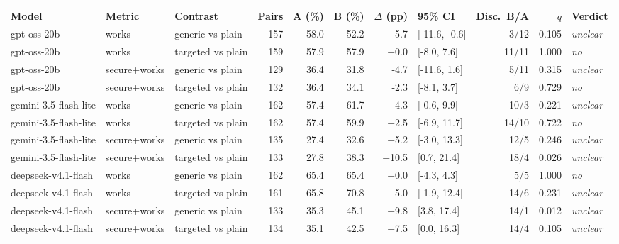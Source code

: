 \begin{tabular}{lllrrrrlrrl}
\toprule
Model & Metric & Contrast & Pairs & A (\%) & B (\%) & $\Delta$ (pp) & 95\% CI & Disc.\ B/A & $q$ & Verdict \\
\midrule
gpt-oss-20b & works & generic vs plain & 157 & 58.0 & 52.2 & -5.7 & [-11.6, -0.6] & 3/12 & 0.105 & \textit{unclear} \\
gpt-oss-20b & works & targeted vs plain & 159 & 57.9 & 57.9 & +0.0 & [-8.0, 7.6] & 11/11 & 1.000 & \textit{no} \\
gpt-oss-20b & secure+works & generic vs plain & 129 & 36.4 & 31.8 & -4.7 & [-11.6, 1.6] & 5/11 & 0.315 & \textit{unclear} \\
gpt-oss-20b & secure+works & targeted vs plain & 132 & 36.4 & 34.1 & -2.3 & [-8.1, 3.7] & 6/9 & 0.729 & \textit{no} \\
gemini-3.5-flash-lite & works & generic vs plain & 162 & 57.4 & 61.7 & +4.3 & [-0.6, 9.9] & 10/3 & 0.221 & \textit{unclear} \\
gemini-3.5-flash-lite & works & targeted vs plain & 162 & 57.4 & 59.9 & +2.5 & [-6.9, 11.7] & 14/10 & 0.722 & \textit{no} \\
gemini-3.5-flash-lite & secure+works & generic vs plain & 135 & 27.4 & 32.6 & +5.2 & [-3.0, 13.3] & 12/5 & 0.246 & \textit{unclear} \\
gemini-3.5-flash-lite & secure+works & targeted vs plain & 133 & 27.8 & 38.3 & +10.5 & [0.7, 21.4] & 18/4 & 0.026 & \textit{unclear} \\
deepseek-v4.1-flash & works & generic vs plain & 162 & 65.4 & 65.4 & +0.0 & [-4.3, 4.3] & 5/5 & 1.000 & \textit{no} \\
deepseek-v4.1-flash & works & targeted vs plain & 161 & 65.8 & 70.8 & +5.0 & [-1.9, 12.4] & 14/6 & 0.231 & \textit{unclear} \\
deepseek-v4.1-flash & secure+works & generic vs plain & 133 & 35.3 & 45.1 & +9.8 & [3.8, 17.4] & 14/1 & 0.012 & \textit{unclear} \\
deepseek-v4.1-flash & secure+works & targeted vs plain & 134 & 35.1 & 42.5 & +7.5 & [0.0, 16.3] & 14/4 & 0.105 & \textit{unclear} \\
\bottomrule
\end{tabular}
